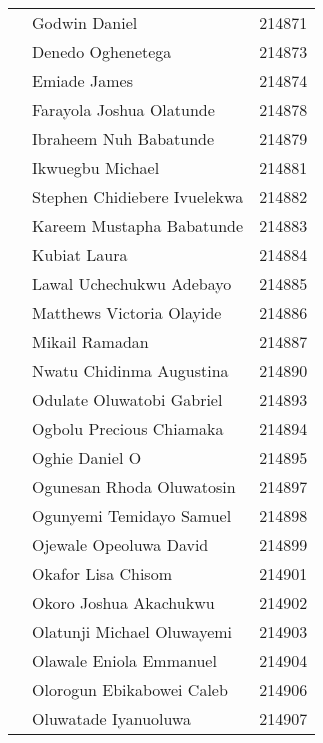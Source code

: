 \documentclass[a4paper]{article}
\newcounter{rowcount}
\newcommand\rownumber{\stepcounter{rowcount}\arabic{rowcount}}
\begin{document}
\begin{center}
\begin{longtable} { c|l|c }
            \rownumber\space & Godwin Daniel & 214871 \\
            \rownumber\space & Denedo Oghenetega & 214873 \\
            \rownumber\space & Emiade James & 214874 \\
            \rownumber\space & Farayola Joshua Olatunde & 214878 \\
            \rownumber\space & Ibraheem Nuh Babatunde & 214879 \\
            \rownumber\space & Ikwuegbu Michael & 214881 \\
            \rownumber\space & Stephen Chidiebere Ivuelekwa & 214882 \\
            \rownumber\space & Kareem Mustapha Babatunde & 214883 \\
            \rownumber\space & Kubiat Laura & 214884 \\
            \rownumber\space & Lawal Uchechukwu Adebayo & 214885 \\
            \rownumber\space & Matthews Victoria Olayide & 214886 \\
            \rownumber\space & Mikail Ramadan & 214887 \\
            \rownumber\space & Nwatu Chidinma Augustina & 214890 \\
            \rownumber\space & Odulate Oluwatobi Gabriel & 214893 \\
            \rownumber\space & Ogbolu Precious Chiamaka & 214894 \\
            \rownumber\space & Oghie Daniel O & 214895 \\
            \rownumber\space & Ogunesan Rhoda Oluwatosin & 214897 \\
            \rownumber\space & Ogunyemi Temidayo Samuel & 214898 \\
            \rownumber\space & Ojewale Opeoluwa David & 214899 \\
            \rownumber\space & Okafor Lisa Chisom & 214901 \\
            \rownumber\space & Okoro Joshua Akachukwu & 214902 \\
            \rownumber\space & Olatunji Michael Oluwayemi & 214903 \\
            \rownumber\space & Olawale Eniola Emmanuel & 214904 \\
            \rownumber\space & Olorogun Ebikabowei Caleb & 214906 \\
            \rownumber\space & Oluwatade Iyanuoluwa & 214907 \\

\end{longtable}
\end{center}
\end{document}
